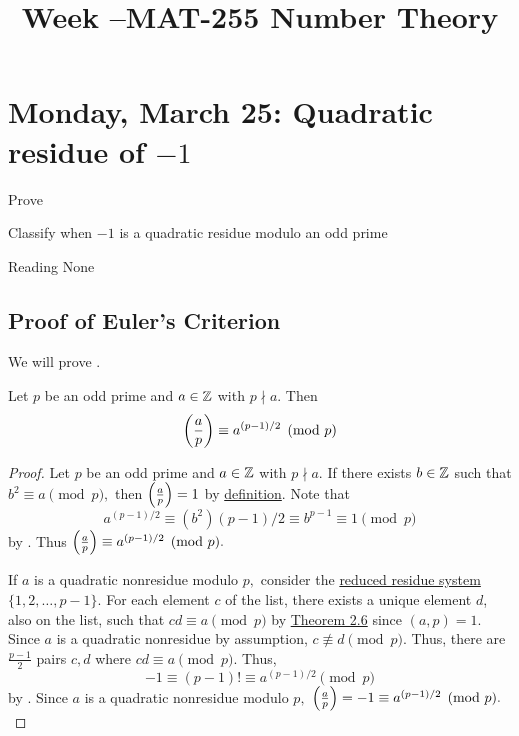 \documentclass[letterpaper, 11 pt]{ximera}
\title{Week \week--MAT-255 Number Theory}
\begin{document}
\section{Monday, March 25: Quadratic residue of $-1$}

\begin{obj}
    \item Prove 
	\item Classify when $-1$ is a quadratic residue modulo an odd prime
\end{obj}


\begin{pre}
    \item[Reading] None
\end{pre}

\subsection{Proof of Euler's Criterion}

We will prove . 

\begin{thm*}
    Let $p$ be an odd prime and $a\in\mathbb Z$ with $p\nmid a.$ Then \[\left(\frac{a}{p}\right)\equiv a^{(p-1)/2}\pmod{p}\]
\end{thm*}

\begin{proof}
	Let $p$ be an odd prime and $a\in\mathbb Z$ with $p\nmid a.$ If there exists $b\in\mathbb Z$ such that $b^2\equiv a\pmod{p},$ then $\left(\frac{a}{p}\right)=1$ by \hyperref[defn:legendre]{definition}.
	Note that \[a^{(p-1)/2}\equiv (b^2){(p-1)/2}\equiv b^{p-1}\equiv 1\pmod{p}\]
	by . Thus $\left(\frac{a}{p}\right)\equiv a^{(p-1)/2}\pmod{p}.$
	
	If $a$ is a quadratic nonresidue modulo $p,$ consider the \hyperref[defn:reduced-res-sys]{reduced residue system} $\{1,2,\dots,p-1\}.$ For each element $c$ of the list, there exists a unique element $d$, also on the list, such that $cd\equiv a\pmod{p}$ by \hyperref[thm:lin-cong-solutions]{Theorem 2.6} since $(a,p)=1$. Since $a$ is a quadratic nonresidue by assumption, $c\not\equiv d\pmod{p}.$ Thus, there are $\frac{p-1}{2}$ pairs $c,d$ where $cd\equiv a\pmod{p}.$ Thus, 
		\[
			-1\equiv (p-1)! \equiv a^{(p-1)/2}\pmod{p}
		\]
	by . Since $a$ is a quadratic nonresidue modulo $p,$ $\left(\frac{a}{p}\right)=-1\equiv a^{(p-1)/2}\pmod{p}.$
\end{proof}
\end{document}
